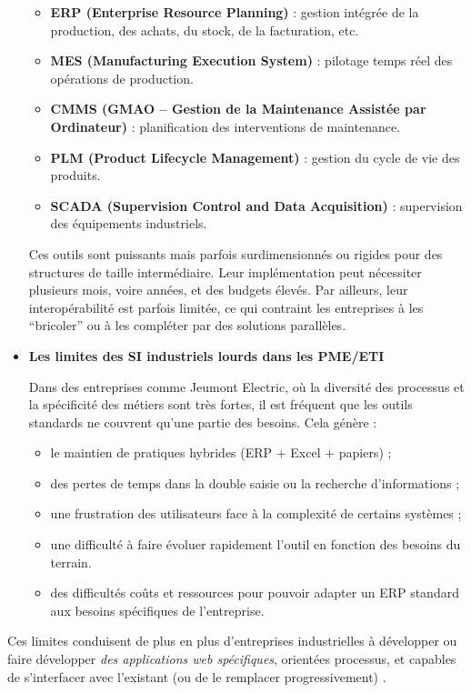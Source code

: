 \documentclass[11pt,a4paper]{article}
\begin{document}
\begin{itemize}
\begin{itemize}
    \item \textbf{ERP (Enterprise Resource Planning)} : gestion intégrée de la production, des achats, du stock, de la facturation, etc.
    \item \textbf{MES (Manufacturing Execution System)} : pilotage temps réel des opérations de production.
    \item \textbf{CMMS (GMAO – Gestion de la Maintenance Assistée par Ordinateur)} : planification des interventions de maintenance.
    \item \textbf{PLM (Product Lifecycle Management)} : gestion du cycle de vie des produits.
    \item \textbf{SCADA (Supervision Control and Data Acquisition)} : supervision des équipements industriels.
\end{itemize}

Ces outils sont puissants mais parfois surdimensionnés ou rigides pour des structures de taille intermédiaire. Leur implémentation peut nécessiter plusieurs mois, voire années, et des budgets élevés. Par ailleurs, leur interopérabilité est parfois limitée, ce qui contraint les entreprises à les “bricoler” ou à les compléter par des solutions parallèles.

\item \textbf{Les limites des SI industriels lourds dans les PME/ETI}

Dans des entreprises comme Jeumont Electric, où la diversité des processus et la spécificité des métiers sont très fortes, il est fréquent que les outils standards ne couvrent qu’une partie des besoins. Cela génère :

\begin{itemize}
    \item le maintien de pratiques hybrides (ERP + Excel + papiers) ;
    \item des pertes de temps dans la double saisie ou la recherche d’informations ;
    \item une frustration des utilisateurs face à la complexité de certains systèmes ;
    \item une difficulté à faire évoluer rapidement l’outil en fonction des besoins du terrain.
    \item des difficultés coûts et ressources pour pouvoir adapter un ERP standard aux besoins spécifiques de l’entreprise.
\end{itemize}
\end{itemize}
Ces limites conduisent de plus en plus d’entreprises industrielles à développer ou faire développer \textit{des applications web spécifiques}, orientées processus, et capables de s’interfacer avec l’existant (ou de le remplacer progressivement) \cite{bib:deloitte2020, bib:ey2021}.
\end{document}

